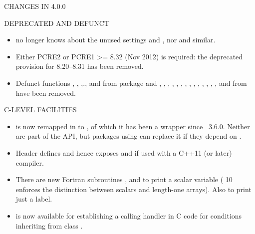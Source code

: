 \documentclass[letterpaper]{book}
\begin{document}
\begin{Section}{ CHANGES IN 4.0.0}
\begin{SubSection}{DEPRECATED AND DEFUNCT}
\begin{itemize}
\item{}  no longer knows about the
unused settings  and , nor
 and similar.

\item{} Either PCRE2 or PCRE1 >= 8.32 (Nov 2012) is required: the
deprecated provision for 8.20--8.31 has been removed.

\item{} Defunct functions , ,
,., and 
from package 
and , , ,
, , ,
, ,
, , ,
, ,
, and  from  have been
removed.

\end{itemize}


\end{SubSection}


%
\begin{SubSection}{C-LEVEL FACILITIES}
\begin{itemize}

\item{}  is now remapped in  to
, of which it has been a wrapper since
\R{}~3.6.0.  Neither are part of the API, but packages using
 can replace it if they depend on .

\item{} Header  defines 
and hence exposes  and  if used
with a C++11 (or later) compiler.

\item{} There are new Fortran subroutines ,
 and  to print a scalar variable
( 10 enforces the distinction between scalars
and length-one arrays).  Also  to print just a label.

\item{}  is now available for
establishing a calling handler in C code for conditions inheriting
from class .

\end{itemize}



\end{SubSection}
\end{Section}
\end{document}
